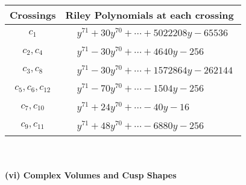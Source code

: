 \documentclass[1p]{elsarticle_modified}
\theoremstyle{definition}
\begin{document}
\begin{tabular}{m{50pt}|m{274pt}}
Crossings & \hspace{64pt}Riley Polynomials at each crossing \\
\hline $$\begin{aligned}c_{1}\end{aligned}$$&$\begin{aligned}
&y^{71}+30 y^{70}+\cdots+5022208 y-65536
\end{aligned}$\\
\hline $$\begin{aligned}c_{2},c_{4}\end{aligned}$$&$\begin{aligned}
&y^{71}-30 y^{70}+\cdots+4640 y-256
\end{aligned}$\\
\hline $$\begin{aligned}c_{3},c_{8}\end{aligned}$$&$\begin{aligned}
&y^{71}-30 y^{70}+\cdots+1572864 y-262144
\end{aligned}$\\
\hline $$\begin{aligned}c_{5},c_{6},c_{12}\end{aligned}$$&$\begin{aligned}
&y^{71}-70 y^{70}+\cdots-1504 y-256
\end{aligned}$\\
\hline $$\begin{aligned}c_{7},c_{10}\end{aligned}$$&$\begin{aligned}
&y^{71}+24 y^{70}+\cdots-40 y-16
\end{aligned}$\\
\hline $$\begin{aligned}c_{9},c_{11}\end{aligned}$$&$\begin{aligned}
&y^{71}+48 y^{70}+\cdots-6880 y-256
\end{aligned}$\\
\hline
\end{tabular}\\~\\
\newpage\flushleft \textbf{(vi) Complex Volumes and Cusp Shapes}
\end{document}
